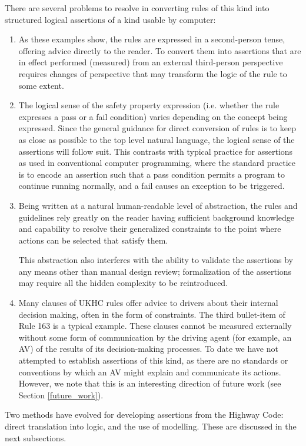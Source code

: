 There are several problems to resolve in converting rules of this kind into structured logical assertions of a kind usable by computer:
\begin{enumerate}
    \item As these examples show, the rules are expressed in a second-person tense, offering advice directly to the reader. To convert them into assertions that are in effect performed (measured) from an external third-person perspective requires changes of perspective that may transform the logic of the rule to some extent.
    \item The logical sense of the safety property expression (i.e. whether the rule expresses a pass or a fail condition) varies depending on the concept being expressed. Since the general guidance for direct conversion of rules is to keep as close as possible to the top level natural language, the logical sense of the assertions will follow suit. This contrasts with typical practice for assertions as used in conventional computer programming, where the standard practice is to encode an assertion such that a pass condition permits a program to continue running normally, and a fail causes an exception to be triggered.
    \item Being written at a natural human-readable level of abstraction, the rules and guidelines rely greatly on the reader having sufficient background knowledge and capability to resolve their generalized constraints to the point where actions can be selected that satisfy them.
    
    This abstraction also interferes with the ability to validate the assertions by any means other than manual design review; formalization of the assertions may require all the hidden complexity to be reintroduced.
    \item Many clauses of UKHC rules offer advice to drivers about their internal decision making, often in the form of constraints. The third bullet-item of Rule 163 is a typical example. These clauses cannot be measured externally without some form of communication by the driving agent (for example, an AV) of the results of its decision-making processes. To date we have not attempted to establish assertions of this kind, as there are no standards or conventions by which an AV might explain and communicate its actions. However, we note that this is an interesting direction of future work (see Section \ref{future_work}). 
\end{enumerate}

Two methods have evolved for developing assertions from the Highway Code: direct translation into logic, and the use of modelling. These are discussed in the next subsections.


